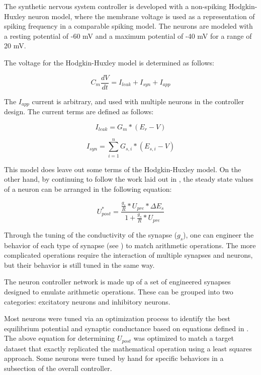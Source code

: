The synthetic nervous system controller is developed with a non-spiking Hodgkin-Huxley neuron model, where the membrane voltage is used as a representation of spiking frequency in a comparable spiking model. The neurons are modeled with a resting potential of -60 mV and a maximum potential of -40 mV for a range of 20 mV.

The voltage for the Hodgkin-Huxley model is determined as follows:

\begin{equation}
C_{m} \dfrac{d V}{d t} = I_{leak} + I_{syn} + I_{app}
\end{equation}

The $I_{app}$ current is arbitrary, and used with multiple neurons in the controller design.
The current terms are defined as follows:

\begin{equation}
I_{leak} = G_{m} * (E_{r} - V)
\end{equation}

\begin{equation}
I_{syn} = \sum_{i=1}^{n} G_{s, i} * (E_{s, i} - V)
\end{equation}

This model does leave out some terms of the Hodgkin-Huxley model. On the other hand, by continuing to follow the work laid out in \cite{NickFunctionalSubnetwork}, the steady state values of a neuron can be arranged in the following equation:

\begin{equation}
U_{post}^{*} = \dfrac{\frac{g_{s}}{R} * U_{pre} * \Delta E_{s}}{1 + \frac{g_{s}}{R} * U_{pre}}
\end{equation}

Through the tuning of the conductivity of the synapse ($g_{s}$), one can engineer the behavior of each type of synapse (see ) to match arithmetic operations. The more complicated operations require the interaction of multiple synapses and neurons, but their behavior is still tuned in the same way.


\label{sec:key_synapses}

The neuron controller network is made up of a set of engineered synapses
designed to emulate arithmetic operations. These can be grouped into two
categories: excitatory neurons and inhibitory neurons. 

Most neurons were tuned
via an optimization process to identify the best equilibrium potential and
synaptic conductance based on equations defined in 
\cite{NickFunctionalSubnetwork}. The above equation for determining $U_{post}$ was optimized to match a target dataset that exactly replicated the mathematical operation using a least squares approach.
Some neurons were tuned by hand for specific behaviors in
a subsection of the overall controller.

